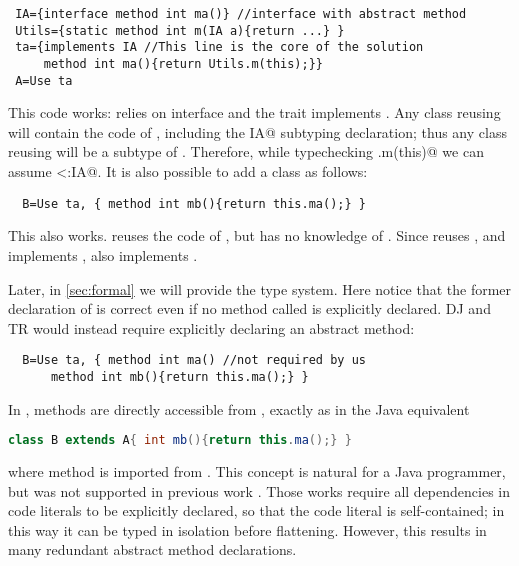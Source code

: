 \begin{lstlisting}
 IA={interface method int ma()} //interface with abstract method
 Utils={static method int m(IA a){return ...} }
 ta={implements IA //This line is the core of the solution
     method int ma(){return Utils.m(this);}}
 A=Use ta
\end{lstlisting}

This code works: \Q@Utils@ relies on interface \Q@IA@ and the trait \Q@ta@
implements \Q@IA@.
Any class reusing \Q@ta@ will contain the code of \Q@ta@,
including the \Q@implements IA@ subtyping declaration; thus any class reusing \Q@ta@ will be a subtype of \Q@IA@. 
Therefore, while typechecking \Q@Utils.m(this)@ we can assume
\Q@this<:IA@.
 It is also possible to add a class \Q@B@ as follows:

\begin{lstlisting}
  B=Use ta, { method int mb(){return this.ma();} }
\end{lstlisting}

This also works.  \Q@B@ reuses the code of \Q@ta@, but has no knowledge of \Q@A@.
Since \Q@B@ reuses \Q@ta@, and \Q@ta@ implements \Q@IA@, \Q@B@ also implements \Q@IA@. 

Later, in \autoref{sec:formal} we will provide the type
system. 
Here notice that the former declaration of \Q@B@ is correct even if
no method called \Q@ma@ is explicitly declared.
DJ and TR would instead require explicitly declaring an abstract \Q@ma@ method:

\begin{lstlisting}
  B=Use ta, { method int ma() //not required by us
      method int mb(){return this.ma();} }
\end{lstlisting}

\noindent
In \name, methods are directly accessible from \Q@ta@, exactly as in the Java equivalent
\begin{lstlisting}[language=Java]
  class B extends A{ int mb(){return this.ma();} }  
\end{lstlisting}

where method \Q@ma@ is imported from \Q@A@.
This concept is natural for a Java programmer, but was not supported
in previous work \cite{BETTINI2013521,deep}. Those works require all
dependencies in code literals to be explicitly declared, so that the
code literal is self-contained;
in this way it can be typed in isolation before flattening.
However, this results in
many redundant abstract method declarations.

